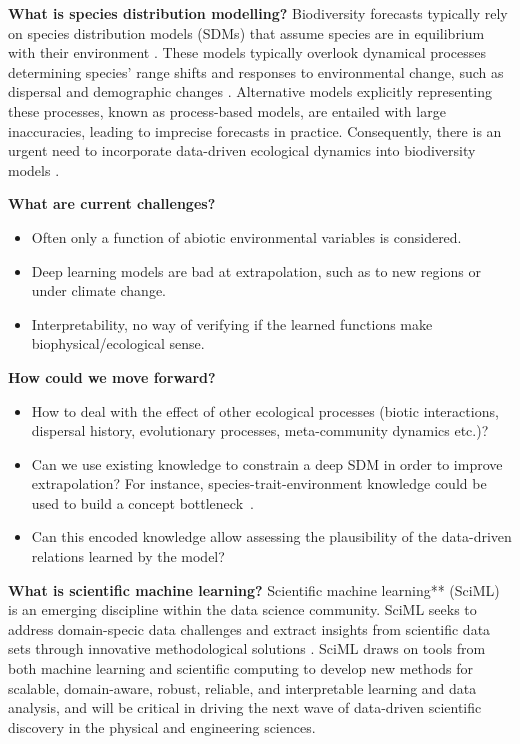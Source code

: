 \noindent\textbf{What is species distribution modelling?}
Biodiversity forecasts typically rely on species distribution models (SDMs) that assume species are in equilibrium with their environment \cite{guisan2000}. These models typically overlook dynamical processes determining species’ range shifts and responses to environmental change, such as dispersal and demographic changes \cite{svenning2013}. Alternative models explicitly representing these processes, known as process-based models, are entailed with large inaccuracies, leading to imprecise forecasts in practice. Consequently, there is an urgent need to incorporate data-driven ecological dynamics into biodiversity models \cite{urban2015}. 

\noindent\textbf{What are current challenges?}
\begin{itemize}
    \item Often only a function of abiotic environmental variables is considered.  
    \item Deep learning models are bad at extrapolation, such as to new regions or under climate change.
    \item Interpretability, no way of verifying if the learned functions make biophysical/ecological sense.
\end{itemize}

\noindent\textbf{How could we move forward?}
\begin{itemize}
\item How to deal with the effect of other ecological processes (biotic interactions, dispersal history, evolutionary processes, meta-community dynamics etc.)?
\item Can we use existing knowledge to constrain a deep SDM in order to improve extrapolation? For instance, species-trait-environment knowledge could be used to build a concept bottleneck~\cite{koh2020concept}. 
\item Can this encoded knowledge allow assessing the plausibility of the data-driven relations learned by the model?
\end{itemize}

\noindent\textbf{What is scientific machine learning?}
Scientific machine learning** (SciML) is an emerging discipline within the data science community.  SciML seeks to address domain-specic data challenges and extract insights from scientific data sets through innovative methodological solutions \cite{rackauckas2020}. SciML draws on tools from both machine learning and scientific computing to develop new methods for scalable, domain-aware, robust, reliable, and interpretable learning and data analysis, and will be critical in driving the next wave of data-driven scientific discovery in the physical and engineering sciences. 

